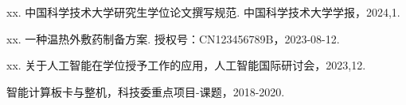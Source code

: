 
\begin{achievements}

\begin{theachievements}[已发表论文]
  \item xx. 中国科学技术大学研究生学位论文撰写规范. 中国科学技术大学学报，2024,1.
\end{theachievements}

\begin{theachievements}[发明专利]
  \item xx. 一种温热外敷药制备方案. 授权号：CN123456789B，2023-08-12.
\end{theachievements}

\begin{theachievements}[会议论文]
  \item xx. 关于人工智能在学位授予工作的应用，人工智能国际研讨会，2023,12.
\end{theachievements}

\begin{theachievements}[参与的科研项目]
  \item 智能计算板卡与整机，科技委重点项目-课题，2018-2020.
\end{theachievements}

\end{achievements}
